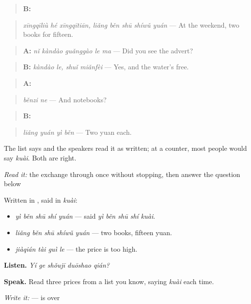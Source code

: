 \begin{quote}
\textbf{B:}  
\end{quote}

\begin{quote}
\emph{xīngqīliù hé xīngqītiān, liǎng běn shū shíwǔ yuán} — At the weekend, two books for fifteen.
\end{quote}

\begin{quote}
\textbf{A:} \emph{nǐ kàndào guǎnggào le ma} — Did you see the advert?
\end{quote}

\begin{quote}
\textbf{B:} \emph{kàndào le, shuǐ miǎnfèi} — Yes, and the water's free.
\end{quote}

\begin{quote}
\textbf{A:} 
\end{quote}

\begin{quote}
\emph{běnzi ne} — And notebooks?
\end{quote}

\begin{quote}
\textbf{B:} 
\end{quote}

\begin{quote}
\emph{liǎng yuán yì běn} — Two yuan each.
\end{quote}

The list says  and the speakers read it as written; at a counter, most people would say \emph{kuài}. Both are right.

\begin{tcolorbox}[breakable,skin=enhanced,colback=orange!6,colframe=orange!45!black,boxrule=0.5pt,arc=1mm,left=6pt,right=6pt,top=4pt,bottom=4pt,fonttitle=\bfseries,title={Read this}]
\emph{Read it:} the exchange through once without stopping, then answer the question below
\end{tcolorbox}

\begin{grammarlens}[title={What you've built — reading prices, saying prices}]
Written in , said in \emph{kuài}:

\begin{itemize}
\raggedright
  \item \textbf{} \emph{yì běn shū shí yuán} — said \emph{yì běn shū shí kuài}.
  \item \textbf{} \emph{liǎng běn shū shíwǔ yuán} — two books, fifteen yuan.
  \item \emph{jiàqián tài guì le} — the price is too high.
\end{itemize}

\textbf{Listen.} \emph{Yí ge shǒujī duōshao qián?}

\textbf{Speak.} Read three prices from a list you know, saying \emph{kuài} each time.

\emph{Write it:}  —  is  over 
\end{grammarlens}

